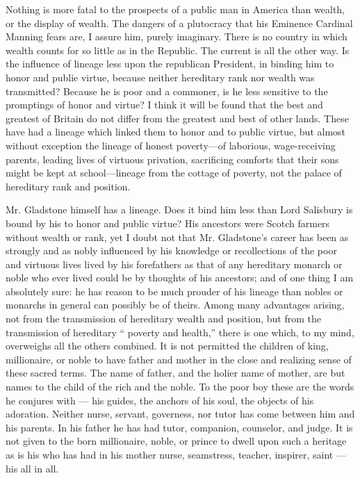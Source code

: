 \documentclass[11pt,openany]{book}
\begin{document}
Nothing is more fatal to the prospects of a public man in America than wealth, or the display of wealth. The dangers of a plutocracy that his Eminence Cardinal Manning fears are, I assure him, purely imaginary. There is no country in which wealth counts for so little as in the Republic. The current is all the other way. Is the influence of lineage less upon the republican President, in binding him to honor and publie virtue, because neither hereditary rank nor wealth was transmitted? Because he is poor and a commoner, is he less sensitive to the promptings of honor and virtue? I think it will be found that the best and greatest of Britain do not differ from the greatest and best of other lands. These have had a lineage which linked them to honor and to public virtue, but almost without exception the lineage of honest poverty---of laborious, wage-receiving parents, leading lives of virtuous privation, sacrificing comforts that their sons might be kept at school---lineage from the cottage of poverty, not the palace of hereditary rank and position.

Mr. Gladstone himself has a lineage. Does it bind him less than Lord Salisbury is bound by his to honor and public virtue? His ancestors were Scotch farmers without wealth or rank, yet I doubt not that Mr. Gladstone's career has been as strongly and as nobly influenced by his knowledge or recollections of the poor and virtuous lives lived by his forefathers as that of any hereditary monarch or noble who ever lived could be by thoughts of his ancestors; and of one thing I am absolutely sure: he has reason to be much prouder of his lineage than nobles or monarchs in general can possibly be of theirs. Among many advantages arising, not from the transmission of hereditary wealth and position, but from the transmission of hereditary `` poverty and health,'' there is one which, to my mind, overweighs all the others combined. It is not permitted the children of king, millionaire, or noble to have father and mother in the close and realizing sense of these sacred terms. The name of father, and the holier name of mother, are but names to the child of the rich and the noble. To the poor boy these are the words he conjures with --- his guides, the anchors of his soul, the objects of his adoration. Neither nurse, servant, governess, nor tutor has come between him and his parents. In his father he has had tutor, companion, counselor, and judge. It is not given to the born millionaire, noble, or prince to dwell upon such a heritage as is his who has had in his mother nurse, seamstress, teacher, inspirer, saint --- his all in all.
\end{document}
